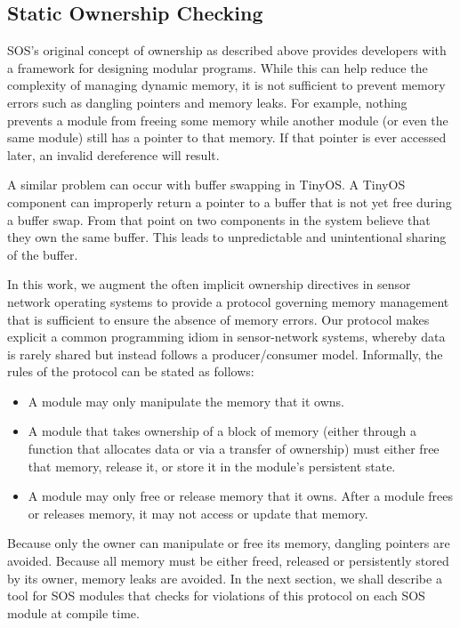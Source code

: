 
\subsection{Static Ownership Checking}

SOS's original concept of ownership as described above provides
developers with a framework for designing modular programs. While this
can help reduce the complexity of managing dynamic memory, it is not
sufficient to prevent memory errors such as dangling pointers and
memory leaks.  For example, nothing prevents a module from freeing
some memory while another module (or even the same module) still has a
pointer to that memory.  If that pointer is ever accessed later, an
invalid dereference will result.  

A similar problem can occur with buffer swapping in TinyOS.  A TinyOS
component can improperly return a pointer to a buffer that is not yet
free during a buffer swap.  From that point on two components in the
system believe that they own the same buffer.  This leads to
unpredictable and unintentional sharing of the buffer.

%
%

In this work, we augment the often implicit ownership directives in
sensor network operating systems to provide a protocol governing
memory management that is sufficient to ensure the absence of memory
errors.  Our protocol makes explicit a common programming idiom in
sensor-network systems, whereby data is rarely shared but instead
follows a producer/consumer model.  
%
Informally, the rules of the protocol can be stated as follows:
%
\begin{itemize}
%
\item A module may only manipulate the memory that it owns.
%
\item A module that takes ownership of a block of memory (either
through a function that allocates data or via a transfer of ownership)
must either free that memory, release it, or store it in the module's
persistent state.
%
\item A module may only free or release memory that it owns.  After a
module frees or releases memory, it may not access or update that
memory.
%
\end{itemize}
%
Because only the owner can manipulate or free its memory, dangling
pointers are avoided.  Because all memory must be either freed,
released or persistently stored by its owner, memory leaks are
avoided.
In the next section, we shall describe a tool for SOS modules that checks
for violations of this protocol on each SOS module at compile time.


